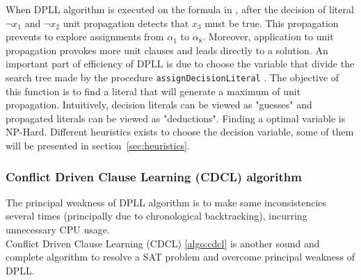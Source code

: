 

When DPLL algorithm is executed on the formula in , after the decision of literal
$\neg x_1$ and $\neg x_2$ unit propagation detects that $x_3$ must be true. This propagation prevents to 
explore assignments from $\alpha_1 $ to $\alpha_{8}$. Moreover, application to unit propagation provokes more unit clauses
and leads directly to a solution. 
An important part of efficiency of DPLL is due to choose the variable that divide the search tree made by
the procedure \texttt{assignDecisionLiteral} . The objective of this function 
is to find a literal that will generate a maximum of unit propagation. Intuitively, decision literals 
can be viewed as "guesses" and propagated literals can be viewed as "deductions". Finding a optimal variable
is NP-Hard. Different heuristics exists to choose the decision variable,
some of them will be presented in section~\ref{sec:heuristics}.


%
%
\subsubsection{Conflict Driven Clause Learning (CDCL) algorithm}\label{sec:cdcl}

The principal weakness of DPLL algorithm is to make same inconsistencies several times
(principally due to chronological backtracking), incurring unnecessary CPU usage.\\
Conflict Driven Clause Learning (CDCL) \cref{algo:cdcl} is another sound and complete algorithm
to resolve a SAT problem and overcome principal weakness of DPLL.



